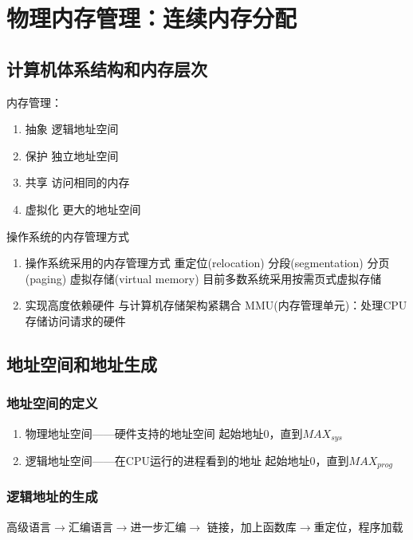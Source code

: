 \chapter{物理内存管理：连续内存分配}
\section{计算机体系结构和内存层次}
内存管理：
\begin{enumerate}
	\item 抽象
	\subitem 逻辑地址空间
	\item 保护
	\subitem 独立地址空间
	\item 共享
	\subitem 访问相同的内存
	\item 虚拟化
	\subitem 更大的地址空间
\end{enumerate}
操作系统的内存管理方式
\begin{enumerate}
	\item 操作系统采用的内存管理方式
	\subitem 重定位(relocation)
	\subitem 分段(segmentation)
	\subitem 分页(paging)
	\subitem 虚拟存储(virtual memory)
	\subsubitem 目前多数系统采用按需页式虚拟存储
	\item 实现高度依赖硬件
	\subitem 与计算机存储架构紧耦合
	\subitem MMU(内存管理单元)：处理CPU存储访问请求的硬件
\end{enumerate}

\section{地址空间和地址生成}
\subsection{地址空间的定义}
\begin{enumerate}
	\item 物理地址空间——硬件支持的地址空间
	\subitem 起始地址0，直到$MAX_{sys}$
	\item 逻辑地址空间——在CPU运行的进程看到的地址
	\subitem 起始地址0，直到$MAX_{prog}$
\end{enumerate}
\subsection{逻辑地址的生成}
高级语言$\rightarrow$汇编语言$\rightarrow$进一步汇编$\rightarrow$
链接，加上函数库$\rightarrow$重定位，程序加载

